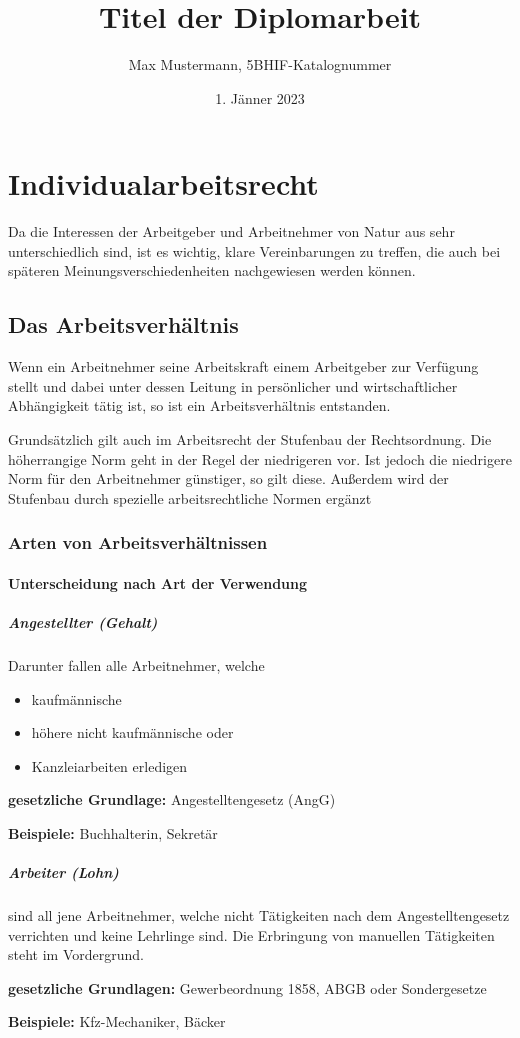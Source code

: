 \documentclass{htblagkr}
\title{Titel der Diplomarbeit}
\author{Max Mustermann, 5BHIF-Katalognummer}
\date{1. Jänner 2023}
\begin{document}
    \section{Individualarbeitsrecht}
    Da die Interessen der Arbeitgeber und Arbeitnehmer von Natur aus sehr unterschiedlich sind, ist es wichtig, klare Vereinbarungen zu treffen, die auch bei späteren Meinungsverschiedenheiten nachgewiesen werden können.

    \subsection{Das Arbeitsverhältnis}
    Wenn ein Arbeitnehmer seine Arbeitskraft einem Arbeitgeber zur Verfügung stellt und dabei unter dessen Leitung in persönlicher und wirtschaftlicher Abhängigkeit tätig ist, so ist ein Arbeitsverhältnis entstanden.

    Grundsätzlich gilt auch im Arbeitsrecht der Stufenbau der Rechtsordnung.
    Die höherrangige Norm geht in der Regel der niedrigeren vor.
    Ist jedoch die niedrigere Norm für den Arbeitnehmer günstiger, so gilt diese.
    Außerdem wird der Stufenbau durch spezielle arbeitsrechtliche Normen ergänzt

    \subsubsection{Arten von Arbeitsverhältnissen}

    \paragraph{Unterscheidung nach Art der Verwendung}

    \subparagraph{Angestellter (Gehalt)}

    Darunter fallen alle Arbeitnehmer, welche

    \begin{itemize}
        \item{kaufmännische}
        \item{höhere nicht kaufmännische oder}
        \item{Kanzleiarbeiten erledigen}
    \end{itemize}

    \textbf{gesetzliche Grundlage:} Angestelltengesetz (AngG)

    \textbf{Beispiele:} Buchhalterin, Sekretär

    \subparagraph{Arbeiter (Lohn)}

    sind all jene Arbeitnehmer, welche nicht Tätigkeiten nach dem Angestelltengesetz verrichten und keine Lehrlinge sind.
    Die Erbringung von manuellen Tätigkeiten steht im Vordergrund.

    \textbf{gesetzliche Grundlagen:} Gewerbeordnung 1858, ABGB oder Sondergesetze

    \textbf{Beispiele:} Kfz-Mechaniker, Bäcker
\end{document}
